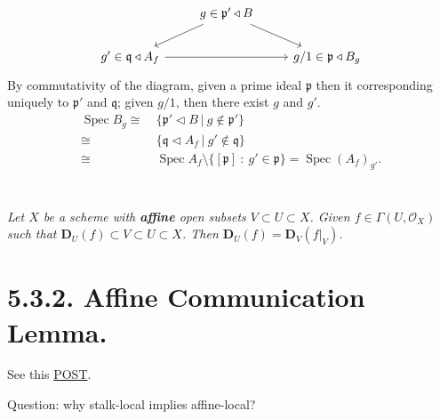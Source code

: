 \[\begin{tikzcd}
	& {g\in\mathfrak p'\triangleleft B} \\
	{g'\in\mathfrak q\triangleleft A_f} && {g/1\in\mathfrak p\triangleleft B_g}
	\arrow[from=1-2, to=2-1]
	\arrow[from=1-2, to=2-3]
	\arrow[from=2-1, to=2-3]
\end{tikzcd}\]
By commutativity of the diagram, given a prime ideal $\mathfrak p$ then it corresponding uniquely to $\mathfrak p'$ and $\mathfrak q$; given $g/1$, then there exist $g$ and $g'$.
\begin{align*}
	\operatorname{Spec}B_g 
	\cong &~ \{\mathfrak p'\triangleleft B ~\vert~ g\notin \mathfrak p'\}\\
	\cong &~ \{\mathfrak q\triangleleft A_f ~\vert~ g'\notin \mathfrak q\}\\
	\cong &~ \operatorname{Spec}A_f\setminus \{[\mathfrak p] ~:~ g'\in \mathfrak p\}=\operatorname{Spec}(A_f)_{g'}.
\end{align*}

\section{}
\textit{Let $X$ be a scheme with \textbf{affine} open subsets $V\subset U\subset X$. Given $f\in \Gamma (U,\mathcal O_X)$ such that $\mathbf D_U(f)\subset V\subset U\subset X$. Then $\mathbf D_U(f)=\mathbf D_V(f\vert_V)$.}
\begin{comment}
\begin{proof}
It suffices to check $\mathbf V_U(f)=\mathbf V_V(f\vert_V)$. 
\begin{align*}
	\mathbf V_U(f) = &~ \{\mathfrak p\in U ~\vert~ f\in\mathfrak p\}\\
	= &~ \{\mathfrak p\in V ~\vert~ f\vert_V\in \mathfrak p\}\\
	= &~ \mathbf V_V(f\vert_V)
\end{align*}
\end{proof}
\end{comment}

\section{5.3.2. Affine Communication Lemma.}

See this \href{http://mathbabysteps.blogspot.com/2016/12/affine-communication-lemma.html}{POST}.

Question: why stalk-local implies affine-local?